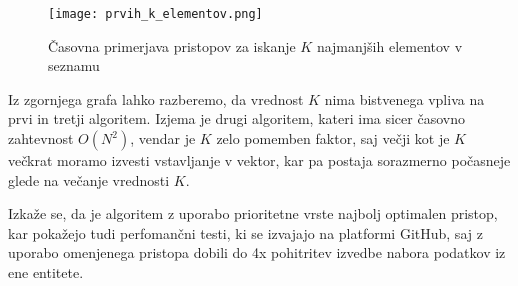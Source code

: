 \documentclass[a4paper,12pt,openright]{book}
\begin{document}
        \begin{figure}[H]
            \centerline{\texttt{[image: prvih\_k\_elementov.png]}}
            \caption{Časovna primerjava pristopov za iskanje $K$ najmanjših elementov v seznamu}
            \label{sl:k_smallest}
        \end{figure}

        \noindent
        Iz zgornjega grafa lahko razberemo, da vrednost $K$ nima bistvenega vpliva na prvi in tretji algoritem. Izjema je drugi algoritem, kateri ima sicer časovno zahtevnost $O(N^2)$, vendar je $K$ zelo pomemben faktor, saj večji kot je $K$ večkrat moramo izvesti vstavljanje v vektor, kar pa postaja sorazmerno počasneje glede na večanje vrednosti $K$.

        Izkaže se, da je algoritem z uporabo prioritetne vrste najbolj optimalen pristop, kar pokažejo tudi perfomančni testi, ki se izvajajo na platformi GitHub, saj z uporabo omenjenega pristopa dobili do 4x pohitritev izvedbe nabora podatkov iz ene entitete.
\end{document}
